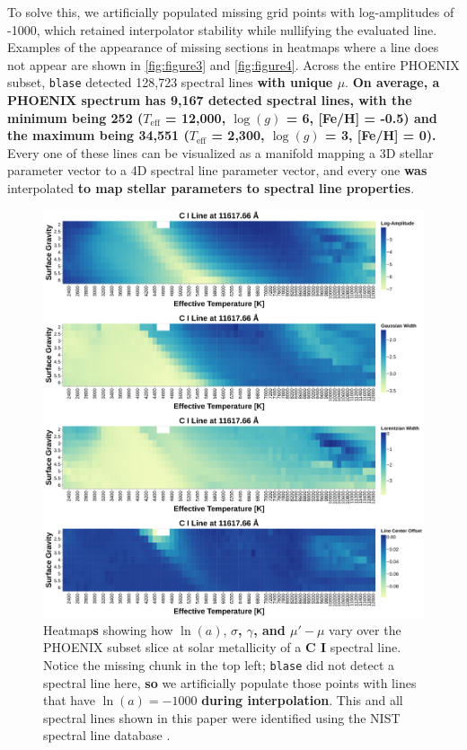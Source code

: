 \documentclass[twocolumn, linenumbers]{aastex631}
\begin{document}
To solve this, we artificially populated missing grid points with log-amplitudes of -1000, which retained interpolator stability while nullifying the evaluated line.
Examples of the appearance of missing sections in heatmaps where a line does not appear are shown in \autoref{fig:figure3} and \autoref{fig:figure4}.
Across the entire PHOENIX subset, \texttt{blase} detected 128,723 spectral lines \textbf{with unique $\mu$}.
\textbf{On average, a PHOENIX spectrum has 9,167 detected spectral lines, with the minimum being 252 ($T_\text{eff}$ = 12,000, $\log(g)$ = 6, [Fe/H] = -0.5) and the maximum being 34,551 ($T_\text{eff}$ = 2,300, $\log(g)$ = 3, [Fe/H] = 0).}
Every one of these lines can be visualized as a manifold mapping a 3D stellar parameter vector to a 4D spectral line parameter vector, and every one \textbf{was} interpolated \textbf{to map stellar parameters to spectral line properties}.
\begin{figure}
    \centering
    \includegraphics[width=\textwidth]{figure3}
    \caption{Heatmap\textbf{s} showing how $\ln(a)$, $\sigma$\textbf{, $\gamma$, and $\mu' - \mu$} vary over the PHOENIX subset slice at solar metallicity of a \textbf{C I} spectral line.
    Notice the missing chunk in the top left; \texttt{blase} did not detect a spectral line here, \textbf{so} we artificially populate those points with lines that have $\ln(a) = -1000$ \textbf{during interpolation}.
    This and all spectral lines shown in this paper were identified using the NIST spectral line database \citep{NIST}.}
    \label{fig:figure3}
\end{figure}
\end{document}

